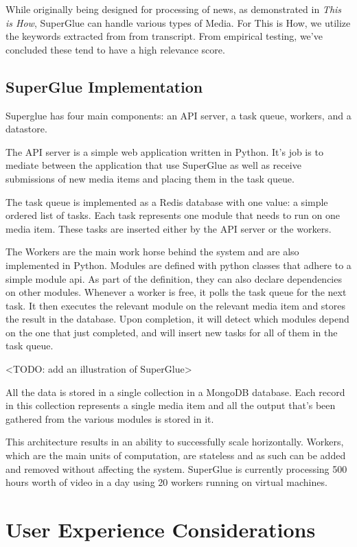 While originally being designed for processing of news, as demonstrated in \textit{This is How}, SuperGlue can handle various types of Media. For This is How, we utilize the keywords extracted from from transcript. From empirical testing, we've concluded these tend to have a high relevance score.    

\subsection{SuperGlue Implementation}

Superglue has four main components: an API server, a task queue, workers, and a datastore. 

The API server is a simple web application written in Python. It's job is to mediate between the application that use SuperGlue as well as receive submissions of new media items and placing them in the task queue. 

The task queue is implemented as a Redis database with one value: a simple ordered list of tasks. Each task represents one module that needs to run on one media item. These tasks are inserted either by the API server or the workers. 

The Workers are the main work horse behind the system and are also implemented in Python. Modules are defined with python classes that adhere to a simple module api. As part of the definition, they can also declare dependencies on other modules. Whenever a worker is free, it polls the task queue for the next task. It then executes the relevant module on the relevant media item and stores the result in the database. Upon completion, it will detect which modules depend on the one that just completed, and will insert new tasks for all of them in the task queue. 

<TODO: add an illustration of SuperGlue>

All the data is stored in a single collection in a MongoDB database. Each record in this collection represents a single media item and all the output that's been gathered from the various modules is stored in it. 

This architecture results in an ability to successfully scale horizontally. Workers, which are the main units of computation, are stateless and as such can be added and removed without affecting the system. SuperGlue is currently processing 500 hours worth of video in a day using 20 workers running on virtual machines.

\section{User Experience Considerations} 

